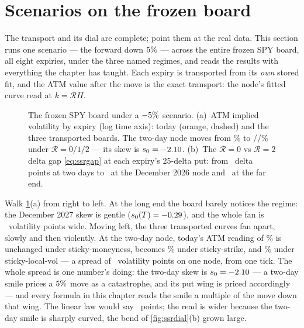 \section{Scenarios on the frozen board}
\label{sec:ssrboard}

The transport and its dial are complete; point them at the real data.  This section
runs one scenario --- the forward down $5\%$ ---
across the entire frozen SPY board, all eight expiries, under the
three named regimes, and reads the results with everything the
chapter has taught.  Each expiry is transported from its \emph{own}
stored fit, and the ATM value after the move is the exact transport:
the node's fitted curve read at $k=\mathcal{R}H$.

\begin{figure}[htbp]
\centering
{}
\caption{The frozen SPY board under a $-5\%$
scenario.  (a)~ATM implied volatility by expiry (log time axis):
today (orange, dashed) and the three transported boards.  The two-day
node moves from \MacSsrScenShortTodayPct\% to
\MacSsrScenShortRzeroPct/\MacSsrScenShortReindexPct/\MacSsrScenShortRtwoPct\%
under $\mathcal{R}=0/1/2$ --- its skew is
$s_0=-2.10$.  (b)~The $\mathcal{R}=0$ vs
$\mathcal{R}=2$ delta gap \eqref{eq:ssrgap} at each expiry's 25-delta
put: from \MacSsrScenGapShortPts\ delta points at two days to
\MacSsrScenGapHeroPts\ at the December 2026 node and
\MacSsrScenGapLongPts\ at the far end.}
\label{fig:ssrscenario}
\end{figure}

Walk \cref{fig:ssrscenario}(a) from right to left.  At the long end
the board barely notices the regime: the December 2027 skew is gentle
($s_0(T)=-0.29$), and the whole fan is
\MacSsrScenLongAtmMovePts\ volatility points wide.  Moving left, the three
transported curves fan apart, slowly and then violently.  At the
two-day node, today's ATM reading of \MacSsrScenShortTodayPct\% is
unchanged under sticky-moneyness, becomes
\MacSsrScenShortReindexPct\% under sticky-strike, and
\MacSsrScenShortRtwoPct\% under sticky-local-vol --- a spread of
\MacSsrScenShortAtmMovePts\ volatility points on one node, from one
tick.  The whole
spread is one number's doing: the two-day skew is
$s_0=-2.10$ --- a two-day smile prices a
$5\%$ move as a catastrophe, and its put wing is
priced accordingly --- and every formula in this chapter reads the
smile a multiple of the move down that wing.  The linear law would
say \MacSsrScenShortLinearPts\ points; the read is wider because the
two-day smile is sharply curved, the bend of \cref{fig:ssrdial}(b)
grown large.

